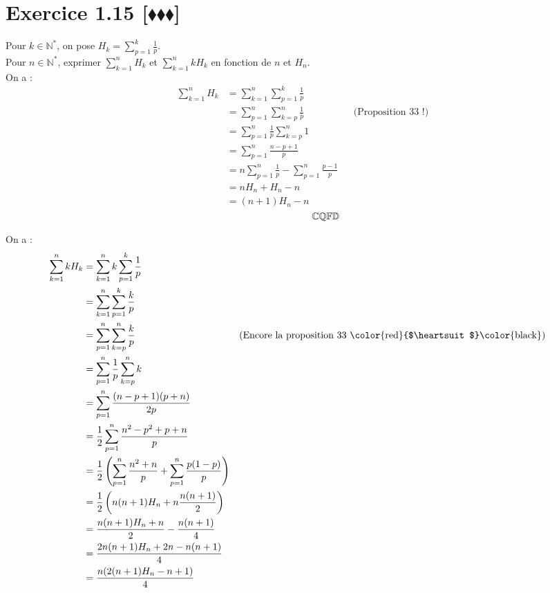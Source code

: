 \documentclass[10pt]{article}
\begin{document}
\section*{Exercice 1.15 [$\blacklozenge\blacklozenge\blacklozenge$]}
\begin{tcolorbox}[enhanced, width=6in, center, size=fbox, fontupper=\large, drop shadow southwest]
    Pour $k\in\mathbb{N}^*$, on pose $H_k=\sum\limits^k_{p=1}{\frac{1}{p}}$.\\
    Pour $n\in\mathbb{N}^*$, exprimer $\sum\limits^n_{k=1}H_k$ et $\sum\limits^n_{k=1}kH_k$ en fonction de $n$ et $H_n$.\\
    On a :
    \begin{align*}
        \sum^n_{k=1}{H_k}
        &=\sum^n_{k=1}{\sum^k_{p=1}{\frac{1}{p}}}\\
        &=\sum^n_{p=1}{\sum^n_{k=p}{\frac{1}{p}}} && \text{(Proposition 33 !)}\\
        &=\sum^n_{p=1}{\frac{1}{p}\sum^n_{k=p}{1}}\\
        &=\sum^n_{p=1}{\frac{n-p+1}{p}}\\
        &=n\sum^n_{p=1}{\frac{1}{p}}-\sum^n_{p=1}{\frac{p-1}{p}}\\
        &=nH_n + H_n - n\\
        &=(n+1)H_n - n
    \end{align*}
    $\rightline{$\mathbb{CQFD}$}$
\end{tcolorbox}

\begin{tcolorbox}[enhanced, width=6in, center, size=fbox, fontupper=\large, drop shadow southwest]
    On a :
    \begin{align*}
        \sum^n_{k=1}{kH_k}
        &=\sum^n_{k=1}{k\sum^k_{p=1}{\frac{1}{p}}}\\
        &=\sum^n_{k=1}{\sum^k_{p=1}{\frac{k}{p}}}\\
        &=\sum^n_{p=1}{\sum^n_{k=p}{\frac{k}{p}}} && \text{(Encore la proposition 33 \color{red}{$\heartsuit$}\color{black})}\\
        &=\sum^n_{p=1}{\frac{1}{p}\sum^n_{k=p}{k}}\\
        &=\sum^n_{p=1}{\frac{(n-p+1)(p+n)}{2p}}\\
        &=\frac{1}{2}\sum^n_{p=1}{\frac{n^2-p^2+p+n}{p}}\\
        &=\frac{1}{2}\left(\sum^n_{p=1}{\frac{n^2+n}{p}}+\sum^{n}_{p=1}{\frac{p(1-p)}{p}}\right)\\
        &=\frac{1}{2}\left(n(n+1)H_n+n\frac{n(n+1)}{2}\right)\\
        &=\frac{n(n+1)H_n+n}{2}-\frac{n(n+1)}{4}\\
        &=\frac{2n(n+1)H_n+2n-n(n+1)}{4}\\
        &=\frac{n(2(n+1)H_n-n+1)}{4}
    \end{align*}
\end{tcolorbox}


    
\end{document}
